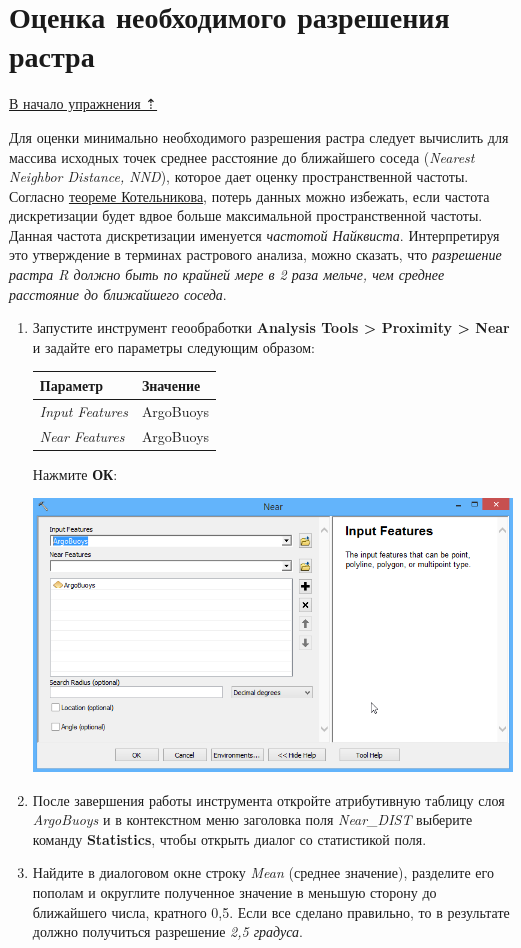\documentclass[]{book}
\theoremstyle{definition}
\theoremstyle{definition}
\theoremstyle{definition}
\theoremstyle{remark}
\begin{document}
\hypertarget{interpolation-resolution}{%
\section{Оценка необходимого разрешения
растра}\label{interpolation-resolution}}

\protect\hyperlink{interpolation}{В начало упражнения ⇡}

Для оценки минимально необходимого разрешения растра следует вычислить
для массива исходных точек среднее расстояние до ближайшего соседа
(\emph{Nearest Neighbor Distance, NND}), которое дает оценку
пространственной частоты. Согласно
\href{https://ru.wikipedia.org/wiki/Теорема_Котельникова}{теореме
Котельникова}, потерь данных можно избежать, если частота дискретизации
будет вдвое больше максимальной пространственной частоты. Данная частота
дискретизации именуется \emph{частотой Найквиста}. Интерпретируя это
утверждение в терминах растрового анализа, можно сказать, что
\emph{разрешение растра R должно быть по крайней мере в 2 раза мельче,
чем среднее расстояние до ближайшего соседа}.

\begin{enumerate}
\def\labelenumi{\arabic{enumi}.}
\item
  Запустите инструмент геообработки \textbf{Analysis Tools
  \textgreater{} Proximity \textgreater{} Near} и задайте его параметры
  следующим образом:

  \begin{longtable}[]{@{}ll@{}}
  \toprule
  Параметр & Значение\tabularnewline
  \midrule
  \endhead
  \emph{Input Features} & ArgoBuoys\tabularnewline
  \emph{Near Features} & ArgoBuoys\tabularnewline
  \bottomrule
  \end{longtable}

  Нажмите \textbf{ОК}:

  \includegraphics{images/Ex16/image8.png}
\item
  После завершения работы инструмента откройте атрибутивную таблицу слоя
  \emph{ArgoBuoys} и в контекстном меню заголовка поля \emph{Near\_DIST}
  выберите команду \textbf{Statistics}, чтобы открыть диалог со
  статистикой поля.
\item
  Найдите в диалоговом окне строку \emph{Mean} (среднее значение),
  разделите его пополам и округлите полученное значение в меньшую
  сторону до ближайшего числа, кратного 0,5. Если все сделано правильно,
  то в результате должно получиться разрешение \emph{2,5 градуса}.
\end{enumerate}
\end{document}
